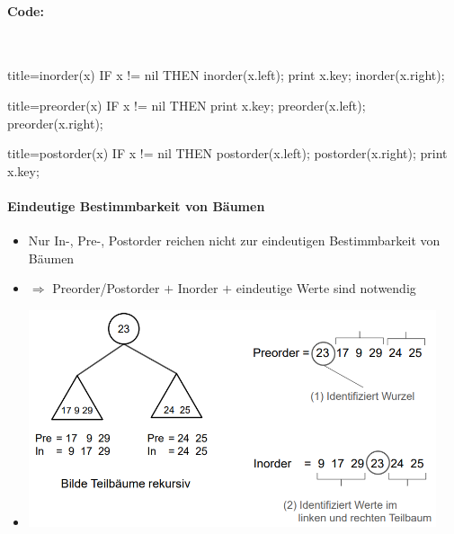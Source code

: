 \documentclass[
    ngerman,
    color=3b,
    load_common, %
    summary,
    boxarc,
]{tuda_summary}
\begin{document}
\paragraph{Code:}\mbox{}\vspace*{-1em}\\
\begin{minipage}[t]{0.33\linewidth}\mbox{}
    \begin{codeBlock}[autogobble,fontsize=\small]{title={inorder(x)}}
        IF x != nil THEN
            inorder(x.left);
            print x.key;
            inorder(x.right);
    \end{codeBlock}
\end{minipage}
\begin{minipage}[t]{0.33\linewidth}\mbox{}
    \begin{codeBlock}[autogobble,fontsize=\small]{title={preorder(x)}}
        IF x != nil THEN
            print x.key;
            preorder(x.left);
            preorder(x.right);
    \end{codeBlock}
\end{minipage}
\begin{minipage}[t]{0.33\linewidth}\mbox{}
    \begin{codeBlock}[autogobble,fontsize=\small]{title={postorder(x)}}
        IF x != nil THEN
            postorder(x.left);
            postorder(x.right);
            print x.key;
    \end{codeBlock}
\end{minipage}
\clearpage
\paragraph{Eindeutige Bestimmbarkeit von Bäumen}
\begin{itemize}
    \item Nur In-, Pre-, Postorder reichen nicht zur eindeutigen Bestimmbarkeit von Bäumen
    \item[] $\Rightarrow$ Preorder/Postorder $+$ Inorder $+$ eindeutige Werte sind notwendig
    \item[] \includegraphics[width=12cm]{pictures/bestimmbarkeitBaum.PNG}
\end{itemize}
\end{document}
